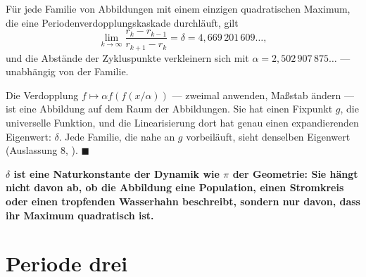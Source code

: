 \begin{merksatz}
Für jede Familie von Abbildungen mit einem einzigen quadratischen Maximum, die eine Periodenverdopplungskaskade durchläuft, gilt
\[ \lim_{k\to\infty}\frac{r_k - r_{k-1}}{r_{k+1} - r_k} = \delta = 4{,}669\,201\,609\ldots, \]
und die Abstände der Zykluspunkte verkleinern sich mit $\alpha = 2{,}502\,907\,875\ldots$ --- unabhängig von der Familie.

Die Verdopplung $f \mapsto \alpha f(f(x/\alpha))$ --- zweimal anwenden, Maßstab ändern --- ist eine Abbildung auf dem Raum der Abbildungen. Sie hat einen Fixpunkt $g$, die universelle Funktion, und die Linearisierung dort hat genau einen expandierenden Eigenwert: $\delta$. Jede Familie, die nahe an $g$ vorbeiläuft, sieht denselben Eigenwert (Auslassung 8, ). $\blacksquare$

\begin{center}
\begin{minipage}{0.9\textwidth}
\textbf{$\delta$ ist eine Naturkonstante der Dynamik wie $\pi$ der Geometrie: Sie hängt nicht davon ab, ob die Abbildung eine Population, einen Stromkreis oder einen tropfenden Wasserhahn beschreibt, sondern nur davon, dass ihr Maximum quadratisch ist.}
\end{minipage}
\end{center}

\begin{center}
\begin{minipage}{0.88\textwidth}
\end{minipage}
\end{center}
\end{merksatz}

\section{Periode drei}

